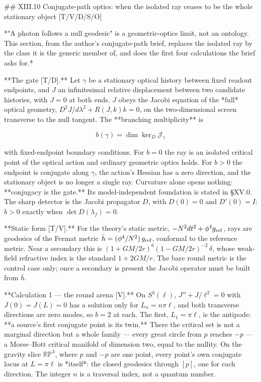 ## XIII.10 Conjugate-path optics: when the isolated ray ceases to be the whole stationary object [T/V/D/S/O]

*"A photon follows a null geodesic" is a geometric-optics limit, not an ontology. This section, from the author's conjugate-path brief, replaces the isolated ray by the class it is the generic member of, and does the first four calculations the brief asks for.*

**The gate [T/D].** Let $\gamma$ be a stationary optical history between fixed readout endpoints, and $J$ an infinitesimal relative displacement between two candidate histories, with $J = 0$ at both ends. $J$ obeys the Jacobi equation of the *full* optical geometry, $D^2J/d\lambda^2+R(J,k)k = 0$, on the two-dimensional screen transverse to the null tangent. The **branching multiplicity** is

$$b(\gamma) = \dim\ker_D\mathcal J_\gamma$$

with fixed-endpoint boundary conditions. For $b = 0$ the ray is an isolated critical point of the optical action and ordinary geometric optics holds. For $b > 0$ the endpoint is conjugate along $\gamma$, the action's Hessian has a zero direction, and the stationary object is no longer a single ray. Curvature alone opens nothing: **conjugacy is the gate.** Its model-independent foundation is stated in §XV.0. The sharp detector is the Jacobi propagator $D$, with $D(0) = 0$ and $D'(0) = I$: $b > 0$ exactly when $\det D(\lambda_f) = 0$.

**Static form [T/V].** For the theory's static metric, $-N^2dt^2+\phi^4g_{\rm ref}$, rays are geodesics of the Fermat metric $\bar h = (\phi^4/N^2)\,g_{\rm ref}$, conformal to the reference metric. Near a secondary this is $(1+GM/2r)^6(1-GM/2r)^{-2}\,\delta$, whose weak-field refractive index is the standard $1+2GM/r$. The bare round metric is the control case only; once a secondary is present the Jacobi operator must be built from $\bar h$.

**Calculation 1 — the round arena [V].** On $S^3(\ell)$, $J''+J/\ell^2 = 0$ with $J(0) = J(L) = 0$ has a solution only for $L_n = n\pi\ell$, and both transverse directions are zero modes, so $b = 2$ at each. The first, $L_1 = \pi\ell$, is the antipode: **a source's first conjugate point is its twin.** There the critical set is not a marginal direction but a whole family — every great circle from $p$ reaches $-p$ — a Morse–Bott critical manifold of dimension two, equal to the nullity. On the gravity slice $\mathbb{RP}^3$, where $p$ and $-p$ are one point, every point's own conjugate locus at $L = \pi\ell$ is *itself*: the closed geodesics through $[p]$, one for each direction. The integer $n$ is a traversal index, not a quantum number.

